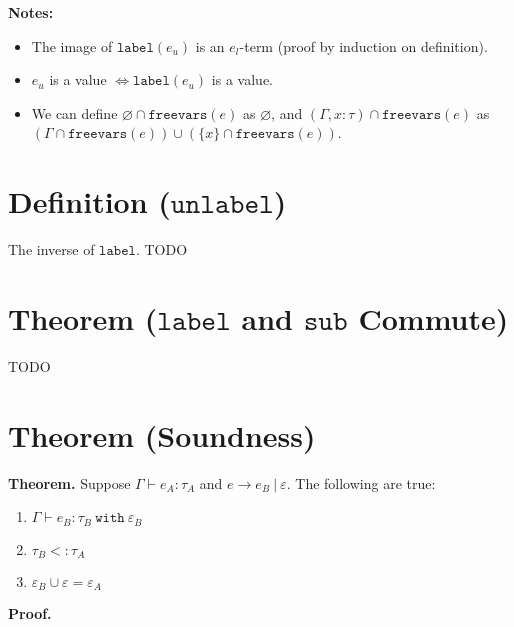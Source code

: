 \documentclass{llncs}
\newcommand{\keywadj}[1]{\mathtt{#1}}
\newcommand{\keyw}[1]{\keywadj{#1}~}
\newcommand{\kwa}[1]{\keywadj{ #1 }}
\newcommand{\type}[2]{
	#1~\keyw{with} #2
}
\begin{document}
\noindent \textbf{Notes:}
\begin{itemize}
	\item The image of $\kwa{label}(e_u)$ is an $e_l$-term (proof by induction on definition).
	\item $e_u$ is a value $\iff \kwa{label}(e_u)$ is a value.
	\item We can define $\varnothing \cap \kwa{freevars}(e)$ as $\varnothing$, and $(\Gamma, x : \tau) \cap \kwa{freevars}(e)$ as $(\Gamma \cap \kwa{freevars}(e)) \cup (\{ x \} \cap \kwa{freevars}(e))$.
\end{itemize}





\section{Definition ($\keywadj{unlabel}$)}

The inverse of $\kwa{label}$. TODO






\section{Theorem ($\kwa{label}$ and $\kwa{sub}$ Commute)}

TODO






\section{Theorem (Soundness)}

\textbf{Theorem.} Suppose $\Gamma \vdash e_A : \tau_A$ and $e \longrightarrow e_B~|~\varepsilon$. The following are true:

	\begin{enumerate}
	\item $\Gamma \vdash e_B : \type{\tau_B}{\varepsilon_B}$
	\item $\tau_B <: \tau_A$
	\item $\varepsilon_B \cup \varepsilon = \varepsilon_A$
	\end{enumerate}

\noindent
\textbf{Proof.} 
\end{document}
